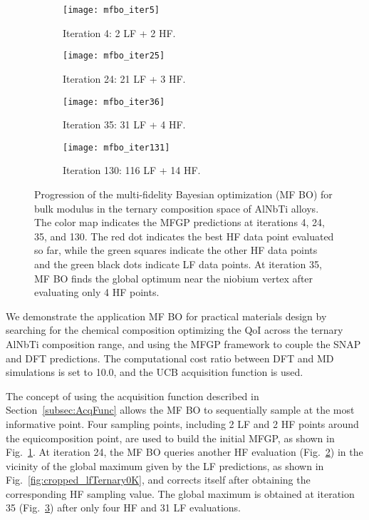 \documentclass[%
 reprint,
aip,jcp
]{revtex4-1}
\begin{document}
\begin{figure*}[!htbp]

\centering
\begin{subfigure}[b]{0.45\textwidth}
	\centering
	\texttt{[image: mfbo\_iter5]}
	\caption{Iteration 4: 2 LF + 2 HF.}
	\label{fig:cropped_mfbo_iter5}
\end{subfigure}
\hfill
\begin{subfigure}[b]{0.45\textwidth}
	\centering
	\texttt{[image: mfbo\_iter25]}
	\caption{Iteration 24: 21 LF + 3 HF.}
	\label{fig:cropped_mfbo_iter25}
\end{subfigure}
\vfill

\begin{subfigure}[b]{0.45\textwidth}
	\texttt{[image: mfbo\_iter36]}
	\caption{Iteration 35: 31 LF + 4 HF.}
	\label{fig:cropped_mfbo_iter36}
\end{subfigure}
\hfill
\begin{subfigure}[b]{0.45\textwidth}
	\texttt{[image: mfbo\_iter131]}
	\caption{Iteration 130: 116 LF + 14 HF.}
	\label{fig:cropped_mfbo_iter131}
\end{subfigure}

\hfill

\caption{Progression of the multi-fidelity Bayesian optimization (MF BO) 
  for bulk modulus in the ternary composition space of AlNbTi alloys. The 
  color map indicates the MFGP predictions at iterations 4, 24, 35, and 130. 
  The red dot indicates the best HF data point evaluated so far, while the 
  green squares indicate the other HF data points and the green black dots 
  indicate LF data points.  At iteration 35, MF BO finds the global optimum 
  near the niobium vertex after evaluating only 4 HF points.
}
\label{fig:MFBO}
\end{figure*}

We demonstrate the application MF BO for practical
materials design by searching for the chemical composition
optimizing the QoI across the ternary AlNbTi composition range, and
using the MFGP framework to couple the SNAP and DFT predictions. 
The computational cost ratio between DFT and MD simulations is set 
to 10.0, and the UCB acquisition function is used.

The concept of using the acquisition function described in 
Section~\ref{subsec:AcqFunc} allows the MF BO to sequentially sample at the most informative point. 
Four sampling points, including 2 LF and 2 HF points around the 
equicomposition point, are used to build the initial MFGP, as shown 
in Fig.~\ref{fig:cropped_mfbo_iter5}. 
At iteration 24, the MF BO queries another HF evaluation 
(Fig.~\ref{fig:cropped_mfbo_iter25}) in the vicinity of the global 
maximum given by the LF predictions, as shown in 
Fig.~\ref{fig:cropped_lfTernary0K}, and corrects itself after 
obtaining the corresponding HF sampling value. 
The global maximum is obtained at iteration 35 
(Fig.~\ref{fig:cropped_mfbo_iter36}) after only four HF 
and 31 LF evaluations. 
\end{document}
